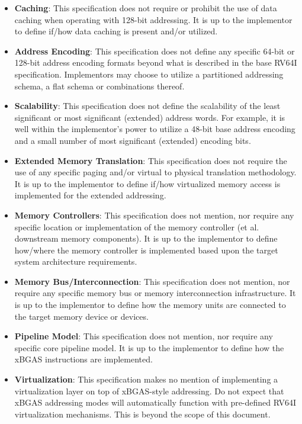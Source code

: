 \documentclass{article}
\begin{document}
\begin{itemize}
\item \textbf{Caching}: This specification does not require or prohibit the use of data caching 
when operating with 128-bit addressing.  It is up to the implementor to define if/how data caching 
is present and/or utilized.  

\item \textbf{Address Encoding}: This specification does not define any specific 64-bit or 128-bit 
address encoding formats beyond what is described in the base RV64I specification.  Implementors 
may choose to utilize a partitioned addressing schema, a flat schema or combinations thereof.    

\item \textbf{Scalability}: This specification does not define the scalability of the least significant 
or most significant (extended) address words.  For example, it is well within the implementor's power to 
utilize a 48-bit base address encoding and a small number of most significant (extended) encoding bits.

\item \textbf{Extended Memory Translation}: This specification does not require the use of any 
specific paging and/or virtual to physical translation methodology.  It is up to the implementor to define 
if/how virtualized memory access is implemented for the extended addressing.

\item \textbf{Memory Controllers}: This specification does not mention, nor require any specific 
location or implementation of the memory controller (et al. downstream memory components).  It is 
up to the implementor to define how/where the memory controller is implemented based upon the 
target system architecture requirements.

\item \textbf{Memory Bus/Interconnection}: This specification does not mention, nor require any 
specific memory bus or memory interconnection infrastructure.  It is up to the implementor to define 
how the memory units are connected to the target memory device or devices.

\item \textbf{Pipeline Model}: This specification does not mention, nor require any specific 
core pipeline model.  It is up to the implementor to define how the xBGAS instructions are 
implemented.

\item \textbf{Virtualization}: This specification makes no mention of implementing a virtualization 
layer on top of xBGAS-style addressing.  Do not expect that xBGAS addressing modes will 
automatically function with pre-defined RV64I virtualization mechanisms.  This is beyond the 
scope of this document.


\end{itemize}
\end{document}
